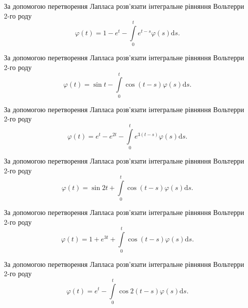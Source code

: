\documentclass[12pt]{extarticle}
\begin{document}
\begin{Exercise}
За допомогою перетворення Лапласа розв’язати інтегральне рівняння Вольтерри 2-го роду \[\varphi(t) = 1 - e^{t} - \int\limits_{0}^{t} e^{t - s} \varphi(s) \mathrm{d}s.\]
\end{Exercise}

\begin{Exercise}
За допомогою перетворення Лапласа розв’язати інтегральне рівняння Вольтерри 2-го роду \[\varphi(t) = \sin t - \int\limits_{0}^{t} \cos (t - s) \varphi(s) \mathrm{d}s.\]
\end{Exercise}

\begin{Exercise}
За допомогою перетворення Лапласа розв’язати інтегральне рівняння Вольтерри 2-го роду \[\varphi(t) = e^{t} - e^{2t} - \int\limits_{0}^{t} e^{3(t - s)} \varphi(s) \mathrm{d}s.\]
\end{Exercise}

\begin{Exercise}
За допомогою перетворення Лапласа розв’язати інтегральне рівняння Вольтерри 2-го роду \[\varphi(t) = \sin 2 t + \int\limits_{0}^{t} \cos (t - s) \varphi(s) \mathrm{d}s.\]
\end{Exercise}

\begin{Exercise}
За допомогою перетворення Лапласа розв’язати інтегральне рівняння Вольтерри 2-го роду \[\varphi(t) = 1 + e^{3t} + \int\limits_{0}^{t} \cos (t - s) \varphi(s) \mathrm{d}s.\]
\end{Exercise}

\begin{Exercise}
За допомогою перетворення Лапласа розв’язати інтегральне рівняння Вольтерри 2-го роду \[\varphi(t) = e^{t} - \int\limits_{0}^{t} \cos 2(t - s) \varphi(s) \mathrm{d}s.\]
\end{Exercise}
\end{document}
